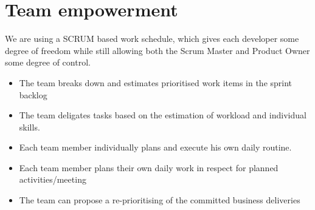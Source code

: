 \section{Team empowerment}

We are using a SCRUM based work schedule, which gives each developer some degree of freedom while still allowing both the Scrum Master
and Product Owner some degree of control.

\begin{itemize}
    \item The team breaks down and estimates prioritised work items in the sprint backlog
    \item The team deligates tasks based on the estimation of workload and individual skills.
    \item Each team member individually plans and execute his own daily routine.
    \item Each team member plans their own daily work in respect for planned activities/meeting
    \item The team can propose a re-prioritising of the committed business deliveries 
\end{itemize}
